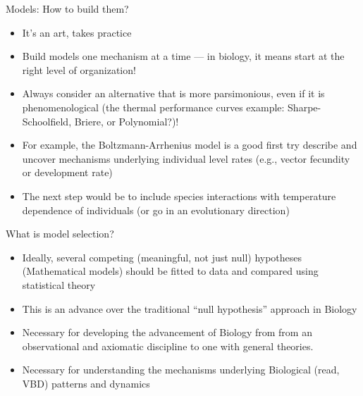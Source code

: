 \documentclass[xcolor=x11names,compress]{beamer}
\renewcommand{\(}{\begin{columns}}
\renewcommand{\)}{\end{columns}}
\newcommand{\<}[1]{\begin{column}{#1}}
\renewcommand{\>}{\end{column}}
\begin{document}

\begin{frame}{Models: How to build them?}

\begin{itemize}\itemsep10pt

	\item It's an art, takes practice 
	\item Build models one mechanism at a time --- in biology, it means 
	start at the right level of organization! 
	\item Always consider an alternative that is more parsimonious, even if 
	it is phenomenological (the thermal performance curves example: Sharpe-Schoolfield, Briere, or Polynomial?)! 

	\item For example, the Boltzmann-Arrhenius model is a good first try 
	describe and uncover mechanisms underlying individual level rates (e.g., vector fecundity or development rate)  

	\item The next step would be to include species interactions with  
	temperature dependence of individuals (or go in an evolutionary direction)

\end{itemize}   

\end{frame}


\begin{frame}{What is model selection?}

	\begin{itemize}[<+->]\itemsep12pt
		 \item Ideally, several competing (meaningful, not just null) hypotheses (Mathematical models) should be fitted to data and compared using statistical theory 
		 \item This is an advance over the traditional ``null hypothesis'' approach in Biology
		 \item Necessary for developing the advancement of Biology from from an observational and axiomatic discipline to one with general theories.
		 \item Necessary for understanding the mechanisms underlying Biological (read, VBD) patterns and dynamics   
	  \end{itemize}
 
 \end{frame}
\end{document}
